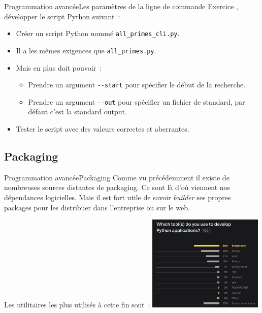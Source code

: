 \documentclass{beamer}
\begin{document}
    \begin{frame}{Programmation avancée}{Les paramètres de la ligne de commande}
        Exercice \execcounterdispinc{}, développer le script Python suivant~:
        \begin{itemize}
            \item Créer un script Python nommé \lstinline{all_primes_cli.py}.
            \item Il a les mêmes exigences que \lstinline{all_primes.py}.
            \item Mais en plus doit pouvoir~:
            \begin{itemize}
                \item Prendre un argument \lstinline{--start} pour spécifier le début de la recherche.
                \item Prendre un argument \lstinline{--out} pour spécifier un fichier de standard, par défaut c'est la standard output.
            \end{itemize}
            \item Tester le script avec des valeurs correctes et aberrantes.
        \end{itemize}
    \end{frame}

    \subsection{Packaging}\label{subsec:packaging}

    \begin{frame}{Programmation avancée}{Packaging}
        Comme vu précédemment il existe de nombreuses sources distantes de packaging.
        Ce sont là d'où viennent nos dépendances logicielles.
        \bigbreak
        Mais il est fort utile de savoir \textit{builder} ses propres packages pour les distribuer dans l'entreprise ou sur le web.

        Les utilitaires les plus utilisés à cette fin sont~:
        \bigbreak
        \centering
        \includegraphics[width=5.5cm]{image/survey_packaging_lib}
    \end{frame}
\end{document}
